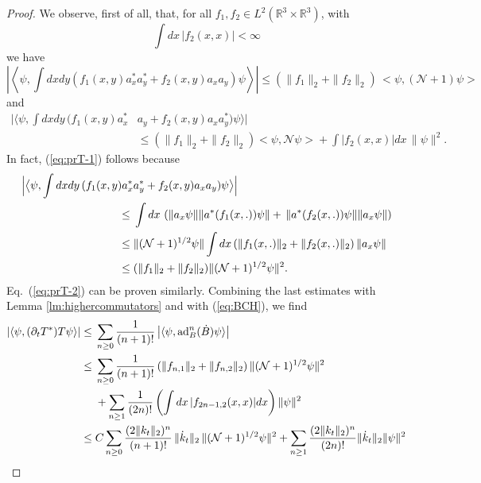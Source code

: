 \documentclass[11pt,a4paper]{article}
\newcommand{\bR}{{\mathbb R}}
\newcommand{\cN}{{\cal N}}
\newcommand{\di}{{d}}		%
\newcommand{\Ncal}{\mathcal{N}}		%
\newcommand{\scal}[2]{\big<#1,#2\big>} %
\begin{document}
\begin{proof}
We observe, first of all, that, for all $f_1, f_2 \in L^2 (\bR^3 \times\bR^3)$, with 
\[ \int dx \, |f_2 (x,x)| < \infty \]
we have
\begin{equation}\label{eq:prT-1}  \left| \left\langle \psi, \int dx dy \left( f_1(x,y) a^\ast_x a^\ast_y + f_2(x,y) a_x a_y \right) \psi \right\rangle \right|  \leq (\| f_1 \|_2 + \| f_2 \|_2) \, \scal{\psi}{(\Ncal+1)\psi} 
\end{equation}
and
\begin{equation}\label{eq:prT-2} \begin{split} \Big|  \big\langle \psi , \int dx dy \, ( f_1(x,y) a^\ast_x
& a_y + f_2(x,y) a_x a^\ast_y ) \psi \big\rangle \Big|  \\ & \leq (\| f_1 \|_2 + \| f_2 \|_2) \scal{\psi}{\Ncal\psi} + \int |f_2(x,x)| \di x  \, \| \psi \|^2 .
\end{split} \end{equation}
In fact, (\ref{eq:prT-1}) follows because
\[ \begin{split} 
 \Big| \big\langle \psi, \int dx dy \, ( f_1(x,y) a^\ast_x &a^\ast_y + f_2(x,y) a_x a_y) \psi \big\rangle \Big| \\
 \leq \; & \int dx \, \left( \| a_x \psi \| \| a^* (f_1(x,.)) \psi \| +  \, \| a^* (f_2 (x,.)) \psi \| \| a_x \psi \| \right) \\
 \leq \; & \| (\cN +1)^{1/2} \psi \|  \int dx \, (\| f_1(x,.) \|_2 + \| f_2 (x,.)\|_2) \,  \| a_x \psi \| \\
 \leq \; & (\| f_1 \|_2 + \| f_2 \|_2) \| (\cN+1)^{1/2} \psi \|^2.
 \end{split} \]
 Eq.\ (\ref{eq:prT-2}) can be proven similarly. Combining the last estimates with Lemma \ref{lm:highercommutators} and with (\ref{eq:BCH}), we find
 \[ \begin{split} 
| \langle \psi , (\partial_t T^*)T \psi \rangle|  \leq \; &\sum_{n \geq 0} \frac{1}{(n+1)!} \left| \langle \psi , \text{ad}^n_B (\dot{B}) \psi \rangle \right| \\
\leq \; &\sum_{n \geq 0} \frac{1}{(n+1)!} \left( \| f_{n,1} \|_2 + \| f_{n,2} \|_2 \right)  \| (\cN+1)^{1/2} \psi \|^2 \\& + \sum_{n\geq 1} \frac{1}{(2n)!}  \left(\int dx \, |f_{2n-1,2} (x,x)| dx \right)  \| \psi \|^2 \\
\leq \; &C \sum_{n\geq 0} \frac{(2 \| k_t \|_2)^n}{(n+1)!} \, \| \dot{k}_t \|_2 \, \| (\cN+1)^{1/2} \psi \|^2 + %
\sum_{n\geq 1} \frac{(2\| k_t \|_2)^n}{(2n)!}  \| \dot k_t \|_2 \| \psi \|^2 \\ 

\end{split}\]
\end{proof}
\end{document}
